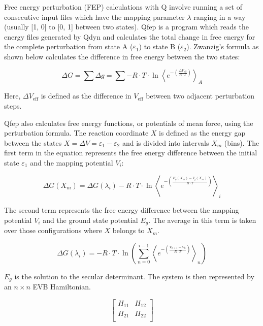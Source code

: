 \documentclass[journal=jacsat,manuscript=article]{achemso}
\begin{document}
Free energy perturbation (FEP) calculations with Q involve running a set of consecutive input files which have the mapping parameter $\lambda$ ranging in a way (usually [1, 0] to [0, 1] between two states). Qfep is a program which reads the energy files generated by Qdyn and calculates the total change in free energy for the complete perturbation from state A ($\varepsilon_1$) to state B ($\varepsilon_2$). Zwanzig’s formula as shown below calculates the difference in free energy between the two states:

\begin{equation}
    \Delta G = \sum \Delta g = \sum -R \cdot T \cdot \ln \left\langle e^{-\left(\frac{\Delta V_{\text{eff}}}{R \cdot T}\right)} \right\rangle_{A}
\end{equation}

Here, \(\Delta V_{\text{eff}}\) is defined as the difference in \( V_{\text{eff}} \) between two adjacent perturbation steps. 

Qfep also calculates free energy functions, or potentials of mean force, using the perturbation formula. The reaction coordinate \(X\) is defined as the energy gap between the states \(X = \Delta V = \varepsilon_1 - \varepsilon_2\) and is divided into intervals \(X_m\) (bins). The first term in the equation represents the free energy difference between the initial state \(\varepsilon_1\) and the mapping potential \(V_i\):

\begin{equation}
    \Delta G(X_m) = \Delta G (\lambda_i) - R \cdot T \cdot \ln \left\langle e^{-\left(\frac{E_g(X_m) - V_i(X_m)}{R \cdot T}\right)} \right\rangle_{i}
\end{equation}

The second term represents the free energy difference between the mapping potential \(V_i\) and the ground state potential \(E_g\). The average in this term is taken over those configurations where \(X\) belongs to \(X_m\).

\begin{equation}
    \Delta G(\lambda_i) = - R \cdot T \cdot \ln \left( \sum_{n=0}^{i-1} \left\langle e^{-\left(\frac{V_{n+1} - V_n}{R \cdot T}\right)} \right\rangle_{n} \right)
\end{equation}

\(E_g\) is the solution to the secular determinant. The system is then represented by an \(n \times n\) EVB Hamiltonian.

\[ 
  \left[\begin{array}{cc}
    H_{11} & H_{12} \\
    H_{21} & H_{22} \\
  \end{array}\right]
\]
\end{document}
